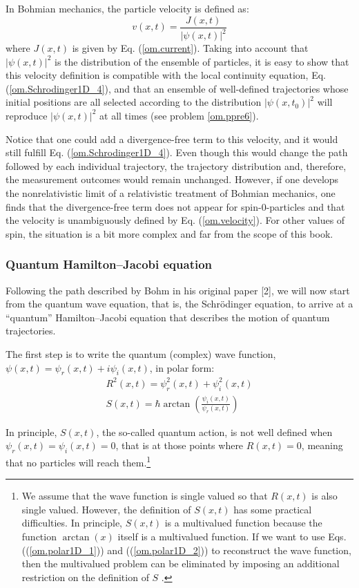 \documentclass[onecolumn,nofootinbib, secnumarabic, amsmath, nobibnotes,12pt,aps,pra]{revtex4-1}
\newcommand{\pref}[1]{(\ref{#1})}
\newcommand{\eref}[1]{Eq. (\ref{#1})}
\begin{document}
In Bohmian mechanics, the particle velocity is defined as:
\begin{equation}
\label{om.velocity}
v(x,t) = \frac{J(x,t)}{|\psi(x,t)|^2}
\end{equation}
where $J(x,t)$ is given by \eref{om.current}.
Taking into account that $|\psi(x,t)|^2$ is the distribution of the ensemble of particles, it is easy to show that this velocity definition is compatible with the local continuity equation, \eref{om.Schrodinger1D_4}, and that an ensemble of well-defined trajectories whose initial positions are all selected according to the distribution $|\psi(x,t_0)|^2$ will reproduce $|\psi(x,t)|^2$ at all times (see problem \ref{om.ppre6}).

Notice that one could add a divergence-free term to this velocity, and it would still fulfill \eref{om.Schrodinger1D_4}. Even though this would change the path followed by each individual trajectory, the trajectory distribution and, therefore, the measurement outcomes would remain unchanged.
However, if one develops the nonrelativistic limit of a relativistic treatment of Bohmian mechanics, one finds that the divergence-free  term does not appear for spin-0-particles and that the velocity is unambiguously defined by \eref{om.velocity}. For other values of spin, the situation is a bit more complex \cite{om.Holland1999,om.Holland2003} and far from the scope of this book.

\subsubsection{Quantum Hamilton--Jacobi equation}\label{sec.quantum_HJ.om}

Following the path described by Bohm in his original paper  [2], we
will now start from the quantum wave equation, that is, the
Schr\"odinger equation, to arrive at a ``quantum'' Hamilton--Jacobi
equation that describes the motion of quantum trajectories.

The first step is to write the quantum (complex) wave function, $\psi(x,t) = \psi_r(x,t) + i \psi_i(x,t)$, in polar form:
\begin{eqnarray}
R^2(x,t) = \psi_{r}^2(x,t) + \psi_{i}^2(x,t) \label{om.polar1D_1} \\
S(x,t) = \hbar \arctan \left(\frac {\psi_{i}(x,t)} {\psi_{r}(x,t)} \right)
\label{om.polar1D_2}
\end{eqnarray}

In principle, $S(x,t)$, the so-called quantum action, is not well defined when $\psi_r(x,t) =
\psi_i(x,t) = 0$, that is  at those points where $R(x,t) = 0$, meaning that no
particles will reach them.\footnote{We assume that the wave function
is single valued so that $R(x,t)$ is also single valued. However,
the definition of $S(x,t)$ has some practical difficulties. In
principle, $S(x,t)$ is a multivalued function because the function
$\arctan(x)$ itself is a multivalued function. If we want to use
Eqs. (\pref{om.polar1D_1}) and (\pref{om.polar1D_2}) to reconstruct
the wave function, then the multivalued problem can be eliminated by
imposing an  additional restriction on the definition of
$S$ \cite{om.Holand1993,om.Bohm1993,om.Durrllibre}.}
\end{document}
